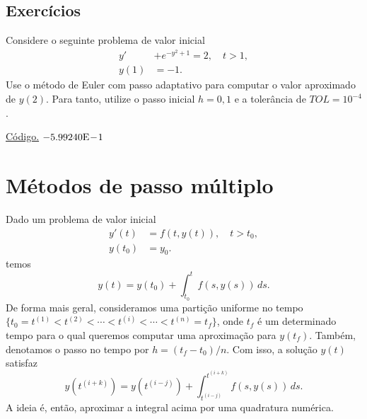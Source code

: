 \subsection*{Exercícios}

\begin{exer}
  Considere o seguinte problema de valor inicial
  \begin{align}
    y' &+ e^{-y^2+1} = 2,\quad t>1,\\
    y(1) &= -1.
  \end{align}
Use o método de Euler com passo adaptativo para computar o valor aproximado de $y(2)$. Para tanto, utilize o passo inicial $h=0,1$ e a tolerância de $TOL=10^{-4}$.
\end{exer}
\begin{resp}
  \ifisoctave 
  \href{https://github.com/phkonzen/notas/blob/master/src/MatematicaNumerica/cap_pvi/dados/exer_Euler_adap/exer_Euler_adap.m}{Código.} 
  \fi
  $-5.99240\mathrm{E}\!-\!1$
\end{resp}


\section{Métodos de passo múltiplo}\label{cap_pvi_sec_passo_mult}

Dado um problema de valor inicial
\begin{align}
  y'(t) &= f(t,y(t)),\quad t>t_0,\\
  y(t_0) &= y_0.
\end{align}
temos
\begin{equation}
  y(t) = y(t_0) + \int_{t_0}^t f(s,y(s))\,ds.
\end{equation}
De forma mais geral, consideramos uma partição uniforme no tempo $\{t_0=t^{(1)} < t^{(2)} < \cdots < t^{(i)} < \cdots < t^{(n)}=t_f\}$, onde $t_f$ é um determinado tempo para o qual queremos computar uma aproximação para $y(t_f)$. Também, denotamos o passo no tempo por $h=(t_f-t_0)/n$. Com isso, a solução $y(t)$ satisfaz
\begin{equation}
  y\left(t^{(i+k)}\right) = y\left(t^{(i-j)}\right) + \int_{t^{(i-j)}}^{t^{(i+k)}} f(s,y(s))\,ds.
\end{equation}
A ideia é, então, aproximar a integral acima por uma quadratura numérica.

